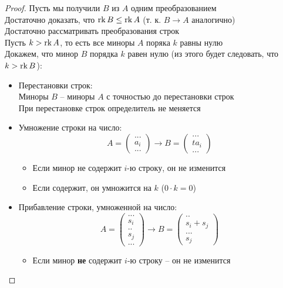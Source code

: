 \begin{proof}
	Пусть мы получили $ B $ из $ A $ одним преобразованием \\
	Достаточно доказать, что $ \operatorname{rk} B \le \operatorname{rk} A $ (т. к. $ B \to A $ аналогично) \\
	Достаточно рассматривать преобразования строк \\
	Пусть $ k > \operatorname{rk} A $, то есть все миноры $ A $ поряка $ k $ равны нулю \\
	Докажем, что минор $ B $ порядка $ k $ равен нулю (из этого будет следовать, что $ k > \operatorname{rk} B $):
	\begin{itemize}
		\item Перестановки строк: \\
		Миноры $ B $ -- миноры $ A $ с точностью до перестановки строк \\
		При перестановке строк определитель не меняется
		\item Умножение строки на число:
		$$ A =
		\begin{pmatrix}
			... \\
			a_i \\
			...
		\end{pmatrix} \to B =
		\begin{pmatrix}
			... \\
			ta_i \\
			...
		\end{pmatrix} $$
		\begin{itemize}
			\item Если минор не содержит $ i $-ю строку, он не изменится
			\item Если содержит, он умножится на $ k $ ($ 0 \cdot k = 0 $)
		\end{itemize}
		\item Прибавление строки, умноженной на число:
		$$ A =
		\begin{pmatrix}
			... \\
			s_i \\
			.. \\
			s_j \\
			...
		\end{pmatrix} \to B =
		\begin{pmatrix}
			.. \\
			s_i + s_j \\
			... \\
			s_j
		\end{pmatrix} $$
		\begin{itemize}
			\item Если минор \textbf{не} содержит $ i $-ю строку -- он не изменится

\end{itemize}
\end{itemize}
\end{proof}
